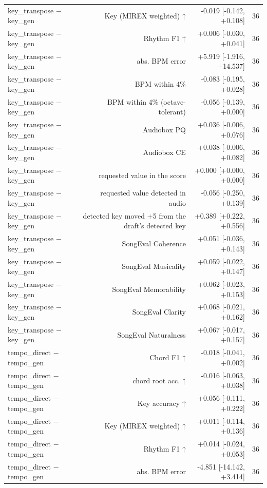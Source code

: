 \begin{table}[t]
\begin{tabular}{lrrr}
key\_transpose $-$ key\_gen & Key (MIREX weighted) ↑ & -0.019 [-0.142, +0.108] & 36 \\
key\_transpose $-$ key\_gen & Rhythm F1 ↑ & +0.006 [-0.030, +0.041] & 36 \\
key\_transpose $-$ key\_gen & abs. BPM error & +5.919 [-1.916, +14.537] & 36 \\
key\_transpose $-$ key\_gen & BPM within 4\% & -0.083 [-0.195, +0.028] & 36 \\
key\_transpose $-$ key\_gen & BPM within 4\% (octave-tolerant) & -0.056 [-0.139, +0.000] & 36 \\
key\_transpose $-$ key\_gen & Audiobox PQ & +0.036 [-0.006, +0.076] & 36 \\
key\_transpose $-$ key\_gen & Audiobox CE & +0.038 [-0.006, +0.082] & 36 \\
key\_transpose $-$ key\_gen & requested value in the score & +0.000 [+0.000, +0.000] & 36 \\
key\_transpose $-$ key\_gen & requested value detected in audio & -0.056 [-0.250, +0.139] & 36 \\
key\_transpose $-$ key\_gen & detected key moved +5 from the draft's detected key & +0.389 [+0.222, +0.556] & 36 \\
key\_transpose $-$ key\_gen & SongEval Coherence & +0.051 [-0.036, +0.143] & 36 \\
key\_transpose $-$ key\_gen & SongEval Musicality & +0.059 [-0.022, +0.147] & 36 \\
key\_transpose $-$ key\_gen & SongEval Memorability & +0.062 [-0.023, +0.153] & 36 \\
key\_transpose $-$ key\_gen & SongEval Clarity & +0.068 [-0.021, +0.162] & 36 \\
key\_transpose $-$ key\_gen & SongEval Naturalness & +0.067 [-0.017, +0.157] & 36 \\
tempo\_direct $-$ tempo\_gen & Chord F1 ↑ & -0.018 [-0.041, +0.002] & 36 \\
tempo\_direct $-$ tempo\_gen & chord root acc. ↑ & -0.016 [-0.063, +0.038] & 36 \\
tempo\_direct $-$ tempo\_gen & Key accuracy ↑ & +0.056 [-0.111, +0.222] & 36 \\
tempo\_direct $-$ tempo\_gen & Key (MIREX weighted) ↑ & +0.011 [-0.114, +0.136] & 36 \\
tempo\_direct $-$ tempo\_gen & Rhythm F1 ↑ & +0.014 [-0.024, +0.053] & 36 \\
tempo\_direct $-$ tempo\_gen & abs. BPM error & -4.851 [-14.142, +3.414] & 36 \\

\end{tabular}
\end{table}
